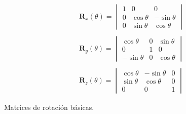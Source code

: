 \begin{customequation}[h!]
    \begin{equation}
        \begin{aligned}
            \mathbf{R}_{x}(\theta)
            =
            \begin{vmatrix}
                1 & 0 & 0 \\
                0 & \cos\theta  & -\sin\theta \\
                0 & \sin\theta & \cos\theta
            \end{vmatrix}
            \\
            \\
            \mathbf{R}_{y}(\theta)
            =
            \begin{vmatrix}
                \cos\theta & 0 & \sin\theta \\
                0 & 1  & 0 \\
                -\sin\theta & 0 & \cos\theta
            \end{vmatrix}
            \\
            \\
            \mathbf{R}_{z}(\theta)
            =
            \begin{vmatrix}
                \cos\theta  & -\sin\theta & 0 \\
                \sin\theta & \cos\theta  & 0 \\
                0 & 0 & 1
            \end{vmatrix}
        \end{aligned}
    \end{equation}
    \caption{Matrices de rotación básicas.}
    \label{eq:matrices-rotacion-basicas}
\end{customequation}

